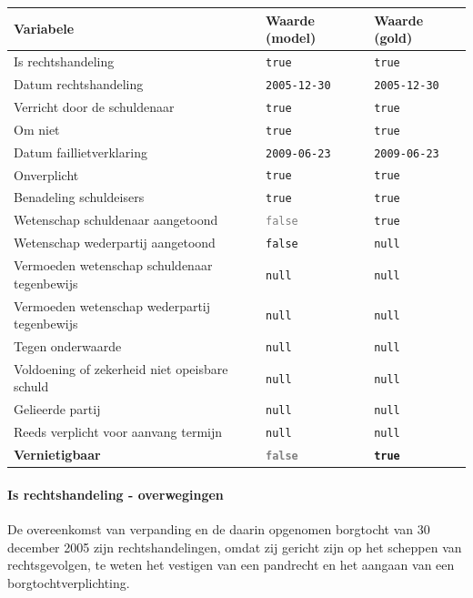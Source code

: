 \documentclass[
  dutch,
  a4paper,
]{article}
\begin{document}
\begin{center}
\small
\begin{tabular}{@{}p{7.4cm}p{2.6cm}p{2.6cm}@{}}
\toprule
Variabele & Waarde (model) & Waarde (gold) \\
\midrule
Is rechtshandeling & \texttt{true} & \texttt{true} \\
Datum rechtshandeling & \texttt{2005-12-30} & \texttt{2005-12-30} \\
Verricht door de schuldenaar & \texttt{true} & \texttt{true} \\
Om niet & \texttt{true} & \texttt{true} \\
Datum faillietverklaring & \texttt{2009-06-23} & \texttt{2009-06-23} \\
Onverplicht & \texttt{true} & \texttt{true} \\
Benadeling schuldeisers & \texttt{true} & \texttt{true} \\
Wetenschap schuldenaar aangetoond & \textcolor{gray}{\texttt{false}} & \texttt{true} \\
Wetenschap wederpartij aangetoond & \texttt{false} & \texttt{null} \\
Vermoeden wetenschap schuldenaar tegenbewijs & \texttt{null} & \texttt{null} \\
Vermoeden wetenschap wederpartij tegenbewijs & \texttt{null} & \texttt{null} \\
Tegen onderwaarde & \texttt{null} & \texttt{null} \\
Voldoening of zekerheid niet opeisbare schuld & \texttt{null} & \texttt{null} \\
Gelieerde partij & \texttt{null} & \texttt{null} \\
Reeds verplicht voor aanvang termijn & \texttt{null} & \texttt{null} \\
\textbf{Vernietigbaar} & \textbf{\textcolor{gray}{\texttt{false}}} & \textbf{\texttt{true}} \\
\bottomrule
\end{tabular}
\end{center}

\paragraph{Is rechtshandeling - overwegingen}\label{is-rechtshandeling---overwegingen-5}

De overeenkomst van verpanding en de daarin opgenomen borgtocht van 30 december 2005 zijn rechtshandelingen, omdat zij gericht zijn op het scheppen van rechtsgevolgen, te weten het vestigen van een pandrecht en het aangaan van een borgtochtverplichting.
\end{document}

